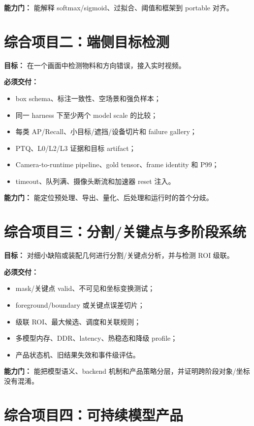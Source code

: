 \textbf{能力门：} 能解释 softmax/sigmoid、过拟合、阈值和框架到 portable 对齐。

\section{综合项目二：端侧目标检测}

\textbf{目标：} 在一个画面中检测物料和方向错误，接入实时视频。

\textbf{必须交付：}

\begin{itemize}
  \item box schema、标注一致性、空场景和强负样本；
  \item 同一 harness 下至少两个 model scale 的比较；
  \item 每类 AP/Recall、小目标/遮挡/设备切片和 failure gallery；
  \item PTQ、L0/L2/L3 证据和目标 artifact；
  \item Camera-to-runtime pipeline、gold tensor、frame identity 和 P99；
  \item timeout、队列满、摄像头断流和加速器 reset 注入。
\end{itemize}

\textbf{能力门：} 能定位预处理、导出、量化、后处理和运行时的首个分歧。

\section{综合项目三：分割/关键点与多阶段系统}

\textbf{目标：} 对细小缺陷或装配几何进行分割/关键点分析，并与检测 ROI 级联。

\textbf{必须交付：}

\begin{itemize}
  \item mask/关键点 valid、不可见和坐标变换测试；
  \item foreground/boundary 或关键点误差切片；
  \item 级联 ROI、最大候选、调度和关联规则；
  \item 多模型内存、DDR、latency、热稳态和降级 profile；
  \item 产品状态机、旧结果失效和事件级评估。
\end{itemize}

\textbf{能力门：} 能把模型语义、backend 机制和产品策略分层，并证明跨阶段对象/坐标没有混淆。

\section{综合项目四：可持续模型产品}

